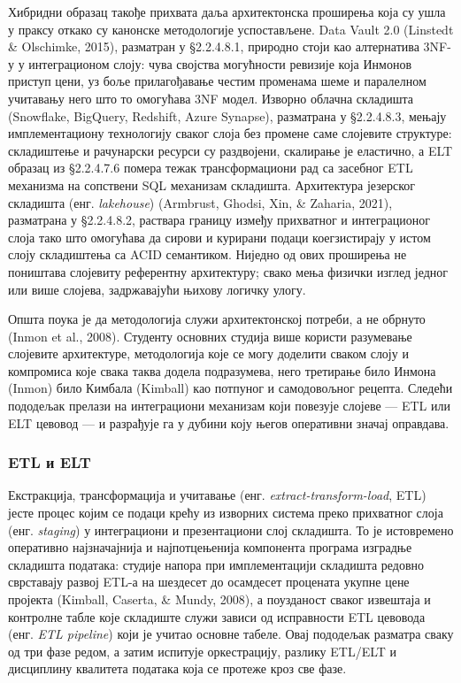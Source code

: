 Хибридни образац такође прихвата даља архитектонска проширења која су ушла у праксу откако су канонске методологије успостављене. Data Vault 2.0 (Linstedt \& Olschimke, 2015), разматран у §2.2.4.8.1, природно стоји као алтернатива 3NF-у у интеграционом слоју: чува својства могућности ревизије која Инмонов приступ цени, уз боље прилагођавање честим променама шеме и паралелном учитавању него што то омогућава 3NF модел. Изворно облачна складишта (Snowflake, BigQuery, Redshift, Azure Synapse), разматрана у §2.2.4.8.3, мењају имплементациону технологију сваког слоја без промене саме слојевите структуре: складиштење и рачунарски ресурси су раздвојени, скалирање је еластично, а ELT образац из §2.2.4.7.6 помера тежак трансформациони рад са засебног ETL механизма на сопствени SQL механизам складишта. Архитектура језерског складишта (енг. \textit{lakehouse}) (Armbrust, Ghodsi, Xin, \& Zaharia, 2021), разматрана у §2.2.4.8.2, раствара границу између прихватног и интеграционог слоја тако што омогућава да сирови и курирани подаци коегзистирају у истом слоју складиштења са ACID семантиком. Ниједно од ових проширења не поништава слојевиту референтну архитектуру; свако мења физички изглед једног или више слојева, задржавајући њихову логичку улогу.

Општа поука је да методологија служи архитектонској потреби, а не обрнуто (Inmon et al., 2008). Студенту основних студија више користи разумевање слојевите архитектуре, методологија које се могу доделити сваком слоју и компромиса које свака таква додела подразумева, него третирање било Инмона (Inmon) било Кимбала (Kimball) као потпуног и самодовољног рецепта. Следећи пододељак прелази на интеграциони механизам који повезује слојеве — ETL или ELT цевовод — и разрађује га у дубини коју његов оперативни значај оправдава.

\subsubsection{ETL и ELT}
Екстракција, трансформација и учитавање (енг. \textit{extract-transform-load}, ETL) јесте процес којим се подаци крећу из изворних система преко прихватног слоја (енг. \textit{staging}) у интеграциони и презентациони слој складишта. То је истовремено оперативно најзначајнија и најпотцењенија компонента програма изградње складишта података: студије напора при имплементацији складишта редовно сврставају развој ETL-а на шездесет до осамдесет процената укупне цене пројекта (Kimball, Caserta, \& Mundy, 2008), а поузданост сваког извештаја и контролне табле које складиште служи зависи од исправности ETL цевовода (енг. \textit{ETL pipeline}) који је учитао основне табеле. Овај пододељак разматра сваку од три фазе редом, а затим испитује оркестрацију, разлику ETL/ELT и дисциплину квалитета података која се протеже кроз све фазе.

